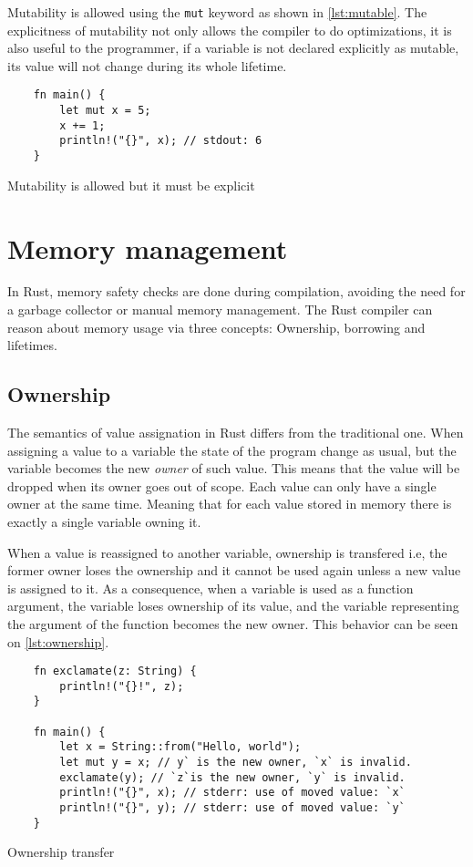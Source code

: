 Mutability is allowed using the \texttt{mut} keyword as shown in \ref{lst:mutable}. The explicitness of mutability not only allows the compiler to do optimizations, it is also useful to the programmer, if a variable is not declared explicitly as mutable, its value will not change during its whole lifetime.

\begin{listing}[h]
	\begin{verbatim}
    fn main() {
        let mut x = 5;
        x += 1;
        println!("{}", x); // stdout: 6 
    }
	\end{verbatim}
  \caption{Mutability is allowed but it must be explicit}
  \label{lst:mutable}
\end{listing}

\section{Memory management}
In Rust, memory safety checks are done during compilation, avoiding the need for a garbage collector or manual memory management. The Rust compiler can reason about memory usage via three concepts: Ownership, borrowing and lifetimes.

\subsection{Ownership}
The semantics of value assignation in Rust differs from the traditional one. When assigning a value to a variable the state of the program change as usual, but the variable becomes the new \textit{owner} of such value. This means that the value will be dropped when its owner goes out of scope. Each value can only have a single owner at the same time. Meaning that for each value stored in memory there is exactly a single variable owning it. 

When a value is reassigned to another variable, ownership is transfered i.e, the former owner loses the ownership and it cannot be used again unless a new value is assigned to it. As a consequence, when a variable is used as a function argument, the variable loses ownership of its value, and the variable representing the argument of the function becomes the new owner. This behavior can be seen on \ref{lst:ownership}.

\begin{listing}[h]
	\begin{verbatim}
    fn exclamate(z: String) {
        println!("{}!", z);
    }

    fn main() {
        let x = String::from("Hello, world");
        let mut y = x; // y` is the new owner, `x` is invalid.
        exclamate(y); // `z`is the new owner, `y` is invalid.
        println!("{}", x); // stderr: use of moved value: `x`
        println!("{}", y); // stderr: use of moved value: `y`
    }
	\end{verbatim}
  \caption{Ownership transfer}
  \label{lst:ownership}
\end{listing}

